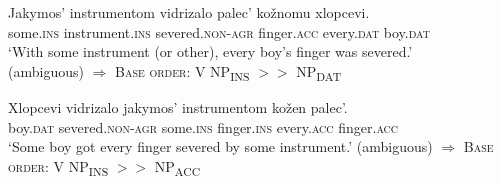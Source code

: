 \documentclass[output=paper,colorlinks,citecolor=brown]{langscibook}
\begin{document}
\ex
\gll   Jakymos’ instrumentom   vidrizalo     palec’     kožnomu xlopcevi.\\
some.\textsc{ins} instrument.\textsc{ins}     severed.\textsc{non-agr}  finger.\textsc{acc}  every.\textsc{dat} boy.\textsc{dat}\\
\glt ‘With some instrument (or other), every boy’s finger was severed.’\\ \hfill    (ambiguous)
\z 
$\Rightarrow$ \textsc{Base order}: V NP\textsubscript{INS} $>>$ NP\textsubscript{DAT}
\z


\ea%
   \label{ex:antonyuk:37}




\ex
\gll   Xlopcevi   vidrizalo    jakymos’ instrumentom kožen palec’.\\
boy.\textsc{dat}    severed.\textsc{non-agr} some.\textsc{ins} finger.\textsc{ins} every.\textsc{acc} finger.\textsc{acc}\\
\glt ‘Some boy got every finger severed by some instrument.’    \hfill  (ambiguous)
\z
$\Rightarrow$ \textsc{Base order}: V NP\textsubscript{INS}  $>>$ NP\textsubscript{ACC}
\z
\end{document}
